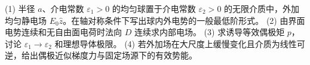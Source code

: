 (1) 半径 \(a\)、介电常数 \(\varepsilon_1>0\) 的均匀球置于介电常数 \(\varepsilon_2>0\) 的无限介质中，外加均匀静电场 \(E_0\hat z\)。在轴对称条件下写出球内外电势的一般最低阶形式。
(2) 由界面电势连续和无自由面电荷时法向 \(D\) 连续求内部电场。
(3) 求诱导等效偶极矩 \(p\)，讨论 \(\varepsilon_1\to\varepsilon_2\) 和理想导体极限。
(4) 若外加场在大尺度上缓慢变化且介质为线性可逆，给出偶极近似梯度力与固定场源下的有效势能。
